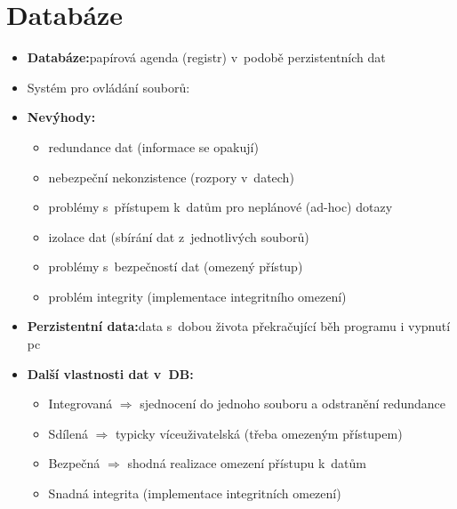 \documentclass[a4paper,10pt]{article}
\newcommand{\pojem}[2]{\item \textbf{#1:}\quad #2}
\newcommand{\tedy}{$\Rightarrow$ }
\begin{document}
	\section{Databáze}
		\begin{itemize}
			\pojem{Databáze}{papírová agenda (registr) v~podobě perzistentních dat}
			\item Systém pro ovládání souborů:
			\pojem{Nevýhody}
			\begin{itemize}
				\item redundance dat (informace se opakují)
				\item nebezpeční nekonzistence (rozpory v~datech)
				\item problémy s~přístupem k~datům pro neplánové (ad-hoc) dotazy
				\item izolace dat (sbírání dat z~jednotlivých souborů)
				\item problémy s~bezpečností dat (omezený přístup)
				\item problém integrity (implementace integritního omezení)
			\end{itemize}

			\pojem{Perzistentní data}{data s~dobou života překračující běh programu i vypnutí pc}
			\pojem{Další vlastnosti dat v~DB}
			\begin{itemize}
				\item Integrovaná \tedy sjednocení do jednoho souboru a odstranění redundance
				\item Sdílená \tedy typicky víceuživatelská (třeba omezeným přístupem)
				\item Bezpečná \tedy shodná realizace omezení přístupu k~datům
				\item Snadná integrita (implementace integritních omezení)
			\end{itemize}


\end{itemize}
\end{document}
